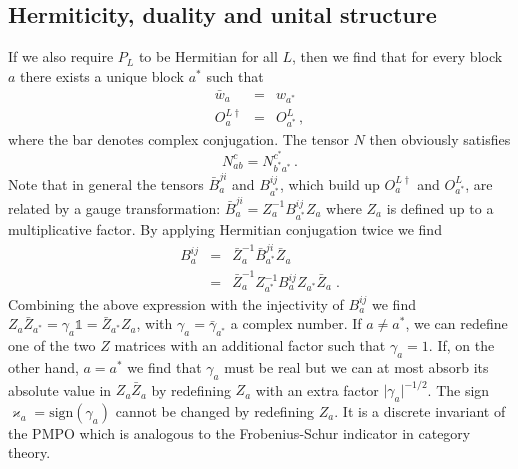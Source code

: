 \documentclass[12 pt]{article}
\begin{document}
\subsection{Hermiticity, duality and unital structure} \label{subsec:hermiticity}
If we also require $P_L$ to be Hermitian for all $L$, then we find that for every block $a$ there exists a unique block $a^*$ such that
\begin{eqnarray}
    \bar{w}_a & = & w_{a^*} \label{realnumber} \\
    O^{L\dagger}_a&  = & O^L_{a^*}\, ,
\end{eqnarray}
where the bar denotes complex conjugation. The tensor $N$ then obviously satisfies
\begin{equation} \label{pivotal3}
    N_{ab}^c = N_{b^*a^*}^{c^*}\, .
\end{equation}
Note that in general the tensors $\bar{B}^{ji}_a$ and $B^{ij}_{a^*}$, which build up $O^{L\dagger}_a$ and $O^L_{a^*}$, are related by a gauge transformation: $\bar{B}^{ji}_a = Z^{-1}_aB^{ij}_{a^*}Z_a$ where $Z_{a}$ is defined up to a multiplicative factor. By applying Hermitian conjugation twice we find
\begin{eqnarray}
    B^{ij}_{a} & = & \bar{Z}_a^{-1} \bar{B}^{ji}_{a^*} \bar{Z}_a \\
    & = & \bar{Z}_a^{-1} Z^{-1}_{a^*} B^{ij}_{a} Z_{a^*} \bar{Z}_a \; .
\end{eqnarray}
Combining the above expression with the injectivity of $B_a^{ij}$ we find $Z_{a}\bar{Z}_{a^\ast} = \gamma_a\mathds{1} = \bar{Z}_{a^*} Z_{a}$, with $\gamma_a=\bar{\gamma}_{a^*}$ a complex number. If $a\neq a^\ast$, we can redefine one of the two $Z$ matrices with an additional factor such that $\gamma_a=1$. If, on the other hand, $a=a^\ast$ we find that $\gamma_a$ must be real but we can at most absorb its absolute value in $Z_a \bar{Z}_a$ by redefining $Z_a$ with an extra factor $\lvert\gamma_a\rvert^{-1/2}$. The sign $\varkappa_a=\text{sign} (\gamma_a)$ cannot be changed by redefining $Z_a$. It is a discrete invariant of the PMPO which is analogous to the Frobenius-Schur indicator in category theory.
\end{document}
